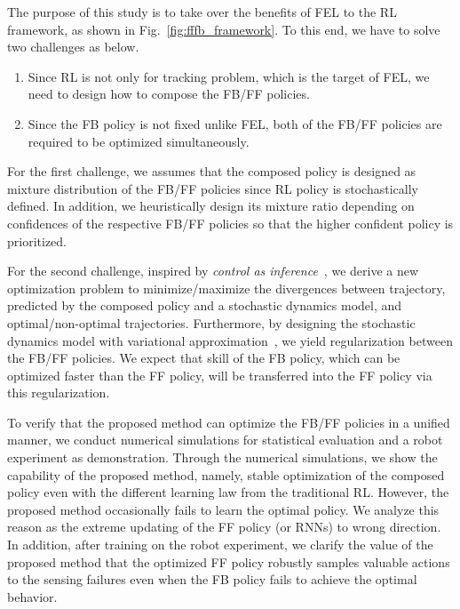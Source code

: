 \documentclass{bmcart}
\begin{document}
The purpose of this study is to  take over the benefits of FEL to the RL framework, as shown in Fig.~\ref{fig:fffb_framework}.
To this end, we have to solve two challenges as below.
\begin{enumerate}
    \item Since RL is not only for tracking problem, which is the target of FEL, we need to design how to compose the FB/FF policies.
    \item Since the FB policy is not fixed unlike FEL, both of the FB/FF policies are required to be optimized simultaneously.
\end{enumerate}

For the first challenge, we assumes that the composed policy is designed as mixture distribution of the FB/FF policies since RL policy is stochastically defined.
In addition, we heuristically design its mixture ratio depending on confidences of the respective FB/FF policies so that the higher confident policy is prioritized.

For the second challenge, inspired by \textit{control as inference}~\cite{levine2018reinforcement}, we derive a new optimization problem to minimize/maximize the divergences between trajectory, predicted by the composed policy and a stochastic dynamics model, and optimal/non-optimal trajectories.
Furthermore, by designing the stochastic dynamics model with variational approximation~\cite{chung2015recurrent}, we yield regularization between the FB/FF policies.
We expect that skill of the FB policy, which can be optimized faster than the FF policy, will be transferred into the FF policy via this regularization.

To verify that the proposed method can optimize the FB/FF policies in a unified manner, we conduct numerical simulations for statistical evaluation and a robot experiment as demonstration.
Through the numerical simulations, we show the capability of the proposed method, namely, stable optimization of the composed policy even with the different learning law from the traditional RL.
However, the proposed method occasionally fails to learn the optimal policy.
We analyze this reason as the extreme updating of the FF policy (or RNNs) to wrong direction.
In addition, after training on the robot experiment, we clarify the value of the proposed method that the optimized FF policy robustly samples valuable actions to the sensing failures even when the FB policy fails to achieve the optimal behavior.

\end{document}
